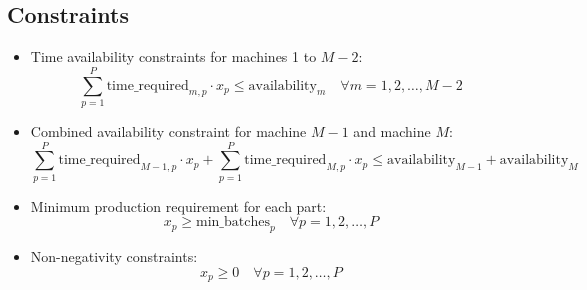 \documentclass{article}
\begin{document}
\subsection*{Constraints}
\begin{itemize}
    \item Time availability constraints for machines 1 to \( M-2 \):
    \[
    \sum_{p=1}^{P} \text{time\_required}_{m,p} \cdot x_p \leq \text{availability}_{m} \quad \forall m = 1, 2, \ldots, M-2
    \]
    \item Combined availability constraint for machine \( M-1 \) and machine \( M \):
    \[
    \sum_{p=1}^{P} \text{time\_required}_{M-1,p} \cdot x_p + \sum_{p=1}^{P} \text{time\_required}_{M,p} \cdot x_p \leq \text{availability}_{M-1} + \text{availability}_{M}
    \]
    \item Minimum production requirement for each part:
    \[
    x_p \geq \text{min\_batches}_{p} \quad \forall p = 1, 2, \ldots, P
    \]
    \item Non-negativity constraints:
    \[
    x_p \geq 0 \quad \forall p = 1, 2, \ldots, P
    \]
\end{itemize}
\end{document}
